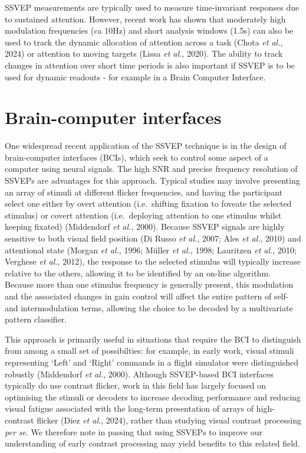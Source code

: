 \documentclass[
  letterpaper,
  DIV=11,
  numbers=noendperiod]{scrartcl}
\begin{document}
SSVEP measurements are typically used to measure time-invariant
responses due to sustained attention. However, recent work has shown
that moderately high modulation frequencies (ca 10Hz) and short analysis
windows (1.5s) can also be used to track the dynamic allocation of
attention across a task (Chota \emph{et al.}, 2024) or attention to
moving targets (Lissa \emph{et al.}, 2020). The ability to track changes
in attention over short time periods is also important if SSVEP is to be
used for dynamic readouts - for example in a Brain Computer Interface.

\section{Brain-computer interfaces}\label{brain-computer-interfaces}

One widespread recent application of the SSVEP technique is in the
design of brain-computer interfaces (BCIs), which seek to control some
aspect of a computer using neural signals. The high SNR and precise
frequency resolution of SSVEPs are advantages for this approach. Typical
studies may involve presenting an array of stimuli at different flicker
frequencies, and having the participant select one either by overt
attention (i.e.~shifting fixation to foveate the selected stimulus) or
covert attention (i.e.~deploying attention to one stimulus whilst
keeping fixated) (Middendorf \emph{et al.}, 2000). Because SSVEP signals
are highly sensitive to both visual field position (Di Russo \emph{et
al.}, 2007; Ales \emph{et al.}, 2010) and attentional state (Morgan
\emph{et al.}, 1996; Müller \emph{et al.}, 1998; Lauritzen \emph{et
al.}, 2010; Verghese \emph{et al.}, 2012), the response to the selected
stimulus will typically increase relative to the others, allowing it to
be identified by an on-line algorithm. Because more than one stimulus
frequency is generally present, this modulation and the associated
changes in gain control will affect the entire pattern of self- and
intermodulation terms, allowing the choice to be decoded by a
multivariate pattern classifier.

This approach is primarily useful in situations that require the BCI to
distinguish from among a small set of possibilties: for example, in
early work, visual stimuli representing `Left' and `Right' commands in a
flight simulator were distinguished robustly (Middendorf \emph{et al.},
2000). Although SSVEP-based BCI interfaces typically do use contrast
flicker, work in this field has largely focused on optimising the
stimuli or decoders to increase decoding performance and reducing visual
fatigue associated with the long-term presentation of arrays of
high-contrast flicker (Diez \emph{et al.}, 2024), rather than studying
visual contrast processing \textit{per se}. We therefore note in passing
that using SSVEPs to improve our understanding of early contrast
processing may yield benefits to this related field.
\end{document}
